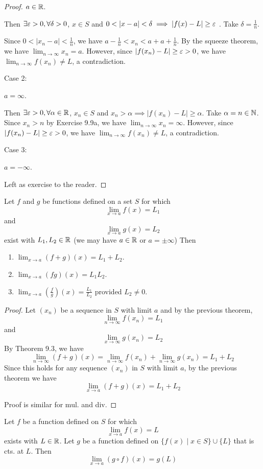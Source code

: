 \documentclass{article}
\begin{document}
\begin{proof}
$a \in \mathbb{R}$.

Then $\exists \varepsilon > 0, \forall \delta > 0$, $x \in S$ and $0 < |x-a| < \delta \implies |f(x) - L| \geq \varepsilon$ . Take $\delta = \frac{1}{n}$.

Since $0 < |x_n - a| < \frac{1}{n}$, we have $a - \frac{1}{n} < x_n < a + a + \frac{1}{n}$. By the squeeze theorem, we have $\lim_{n\to\infty} x_n = a$. However, since $|f(x_n) - L| \geq \varepsilon > 0$, we have $\lim_{n\to\infty} f(x_n) \neq L$, a contradiction.

Case 2:

$a = \infty$.

Then $\exists \varepsilon > 0, \forall \alpha \in \mathbb{R}$, $x_n \in S$ and $x_n > \alpha \implies |f(x_n) - L| \geq \alpha$. Take $\alpha = n \in \mathbb{N}$. Since $x_n > n$ by Exercise 9.9a, we have $\lim_{n\to\infty} x_n = \infty$. However, since $|f(x_n) - L| \geq \varepsilon > 0$, we have $\lim_{n\to\infty} f(x_n) \neq L$, a contradiction.

Case 3:

$a = -\infty$.

Left as exercise to the reader.
\end{proof}
\begin{cthm}[Theorem 20.4]
Let $f$ and $g$ be functions defined on a set $S$ for which
\[
\lim_{x\to a}f(x) = L_1
\]
and \[
\lim_{x\to a}g(x) = L_2
\]
exist with $L_1, L_2 \in \mathbb{R}$ (we may have $a \in \mathbb{R}$ or $a = \pm\infty$) Then
\begin{enumerate}
    \item $\lim_{x\to a} (f+ g)(x) = L_1 + L_2$.
    \item $\lim_{x \to a} (fg)(x) = L_1L_2$.
    \item $\lim_{x \to a} \left( \frac{f}{g} \right) (x) = \frac{L_1}{L_2}$ provided $L_2 \neq 0$.
\end{enumerate}
\end{cthm}
\begin{proof}
Let $(x_n)$ be a sequence in $S$ with limit $a$ and by the previous theorem,
\[
\lim_{n\to\infty} f(x_n) = L_1
\]
and \[
\lim_{x\to \infty}g(x_n) = L_2
\]
By Theorem 9.3, we have
\[
    \lim_{n\to\infty}(f + g)(x) = \lim_{n\to\infty}f(x_n) + \lim_{n\to\infty}g(x_n) = L_1 + L_2
\]
Since this holds for any sequence $(x_n)$ in $S$ with limit $a$, by the previous theorem we have
\[
\lim_{x\to a}(f+g)(x) = L_1 + L_2
\]

Proof is similar for mul. and div.
\end{proof}
\begin{cthm}[Theorem 20.5]
Let $f$ be a function defined on $S$ for which \[
\lim_{x\to a}f(x) = L
\]
exists with $L \in \mathbb{R}$. Let $g$ be a function defined on $\{f(x) \mid x \in S\} \cup \{L\}$ that is cts. at $L$. Then \[
\lim_{x\to a} (g \circ f)(x) = g(L)
\]
\end{cthm}
\end{document}

